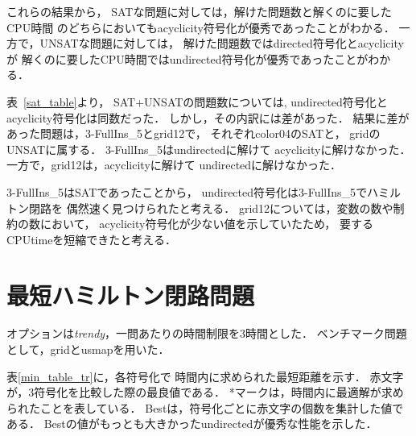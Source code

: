 これらの結果から，
\textsf{SAT}な問題に対しては，解けた問題数と解くのに要したCPU時間
のどちらにおいても\textsf{acyclicity}符号化が優秀であったことがわかる．
一方で，\textsf{UNSAT}な問題に対しては，
解けた問題数では\textsf{directed}符号化と\textsf{acyclicity}が
解くのに要したCPU時間では\textsf{undirected}符号化が優秀であったことがわかる．

表~\ref{sat_table}より，
\textsf{SAT+UNSAT}の問題数については,
\textsf{undirected}符号化と\textsf{acyclicity}符号化は同数だった．
しかし，その内訳には差があった．
結果に差があった問題は，\textsf{3-FullIns\_5}と\textsf{grid12}で，
それぞれ\textsf{color04}の\textsf{SAT}と，
\textsf{grid}の\textsf{UNSAT}に属する．
\textsf{3-FullIns\_5}は\textsf{undirected}に解けて
\textsf{acyclicity}に解けなかった．
一方で，\textsf{grid12}は，\textsf{acyclicity}に解けて
\textsf{undirected}に解けなかった．

\textsf{3-FullIns\_5}は\textsf{SAT}であったことから，
\textsf{undirected}符号化は\textsf{3-FullIns\_5}でハミルトン閉路を
偶然速く見つけられたと考える．
\textsf{grid12}については，変数の数や制約の数において，
\textsf{acyclicity}符号化が少ない値を示していたため，
要するCPUtimeを短縮できたと考える．


\section{最短ハミルトン閉路問題}


オプションは\textit{trendy}，一問あたりの時間制限を3時間とした．
ベンチマーク問題として，\textsf{grid}と\textsf{usmap}を用いた．

表\ref{min_table_tr}に，各符号化で
時間内に求められた最短距離を示す．
赤文字が，3符号化を比較した際の最良値である．
*マークは，時間内に最適解が求められたことを表している．
Bestは，符号化ごとに赤文字の個数を集計した値である．
Bestの値がもっとも大きかった\textsf{undirected}が優秀な性能を示した．


